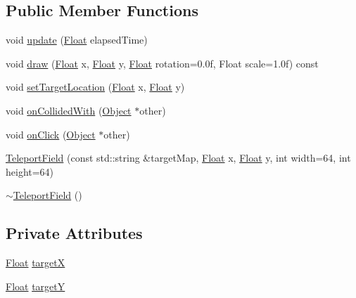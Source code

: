 \subsection*{Public Member Functions}
\begin{DoxyCompactItemize}
\item 
void \hyperlink{classZeta_1_1TeleportField_adb34dc8923414172d3b00ae12bccfcd9}{update} (\hyperlink{namespaceZeta_a1e0a1265f9b3bd3075fb0fabd39088ba}{Float} elapsed\+Time)
\item 
void \hyperlink{classZeta_1_1TeleportField_a8b6962191caa86d2f70093fafe02e174}{draw} (\hyperlink{namespaceZeta_a1e0a1265f9b3bd3075fb0fabd39088ba}{Float} x, \hyperlink{namespaceZeta_a1e0a1265f9b3bd3075fb0fabd39088ba}{Float} y, \hyperlink{namespaceZeta_a1e0a1265f9b3bd3075fb0fabd39088ba}{Float} rotation=0.\+0f, Float scale=1.\+0f) const 
\item 
void \hyperlink{classZeta_1_1TeleportField_aeb8172def07ccade8d9bba8c99ec62d6}{set\+Target\+Location} (\hyperlink{namespaceZeta_a1e0a1265f9b3bd3075fb0fabd39088ba}{Float} x, \hyperlink{namespaceZeta_a1e0a1265f9b3bd3075fb0fabd39088ba}{Float} y)
\item 
void \hyperlink{classZeta_1_1TeleportField_af75c6e36d28226b3aa5e1d4587ee833c}{on\+Collided\+With} (\hyperlink{classZeta_1_1Object}{Object} $\ast$other)
\item 
void \hyperlink{classZeta_1_1TeleportField_a1552c4e86d672918b7145c950ca2d6be}{on\+Click} (\hyperlink{classZeta_1_1Object}{Object} $\ast$other)
\item 
\hyperlink{classZeta_1_1TeleportField_a3ea0d91f37961034f89657dc16432348}{Teleport\+Field} (const std\+::string \&target\+Map, \hyperlink{namespaceZeta_a1e0a1265f9b3bd3075fb0fabd39088ba}{Float} x, \hyperlink{namespaceZeta_a1e0a1265f9b3bd3075fb0fabd39088ba}{Float} y, int width=64, int height=64)
\item 
\hyperlink{classZeta_1_1TeleportField_af1dde529ae823f016c8db3536e1b67d0}{$\sim$\+Teleport\+Field} ()
\end{DoxyCompactItemize}
\subsection*{Private Attributes}
\begin{DoxyCompactItemize}
\item 
\hyperlink{namespaceZeta_a1e0a1265f9b3bd3075fb0fabd39088ba}{Float} \hyperlink{classZeta_1_1TeleportField_ab2862eb499f66d91c7594f01e141d48b}{target\+X}
\item 
\hyperlink{namespaceZeta_a1e0a1265f9b3bd3075fb0fabd39088ba}{Float} \hyperlink{classZeta_1_1TeleportField_a71ec5c1808f550d6e11c4fb889776d49}{target\+Y}
\end{DoxyCompactItemize}
